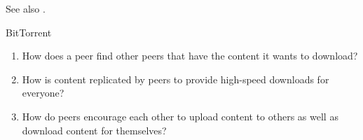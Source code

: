 See also .
  
\begin{frame}{BitTorrent}
  \centering
  \mode<beamer>{\texttt{[image: bt-ast]} }%

  {\footnotesize
    \begin{enumerate}
    \item How does a peer find other peers that have the content it wants to download?
    \item How is content replicated by peers to provide high-speed downloads for everyone?
    \item How do peers encourage each other to upload content to others as well as
      download content for themselves?
    \end{enumerate}}
\end{frame}

